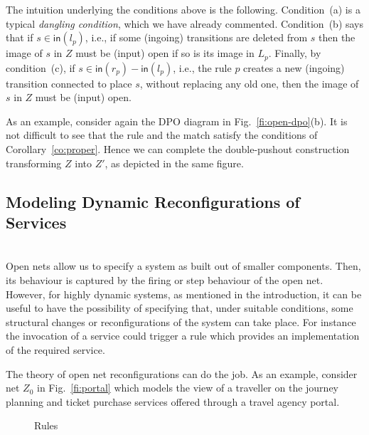 \documentclass{LMCS}
\newcommand{\inp}[1]{\ensuremath{\mathsf{in}({#1})}}
\begin{document}
The intuition underlying the conditions above is the following.
Condition~(a) is a typical \emph{dangling condition}, which we have already commented.
Condition~(b) says that if $s \in \inp{l_p}$, i.e., if some
(ingoing) transitions are deleted from $s$ then the image of $s$ 
in $Z$ must be (input) open if so is its image in $L_p$.
Finally, by condition~(c), if $s \in \inp{r_p}-\inp{l_p}$, i.e., the rule
$p$ creates a new (ingoing) transition connected to place $s$,
without replacing any old one, then the image of $s$ in $Z$
must be (input) open.


As an example, consider again the DPO diagram in Fig.~\ref{fi:open-dpo}(b).
It is not difficult to see that the rule and the match
satisfy the conditions of Corollary~\ref{co:proper}. Hence we can
complete the double-pushout construction transforming  
$Z$ into $Z'$, as depicted in the same figure.

\subsection{Modeling Dynamic Reconfigurations of Services}
\ \\

\noindent
Open nets allow us to specify a system as built out of smaller
components. Then, its behaviour is captured by the firing or step
behaviour of the open net. However, for highly dynamic systems, as
mentioned in the introduction, it can be useful to have the
possibility of specifying that, under suitable conditions, some
structural changes or reconfigurations of the system can take place.
For instance
the invocation of a service
could trigger a rule which provides an implementation of the required service.


The theory of open net reconfigurations can do the job.
As an example, consider net $Z_0$ in  Fig.~\ref{fi:portal}
which models the view of a traveller on the journey planning and
ticket purchase services offered through a travel agency portal.

\begin{figure}[t]
  \begin{center}
  \end{center}

  \caption{Rules}
  \label{fi:rules}
\end{figure}
\end{document}
